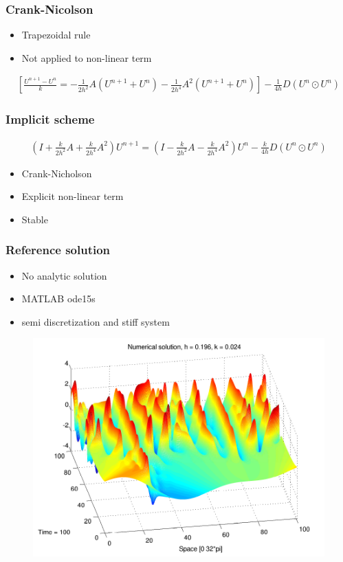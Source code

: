 \documentclass[screen]{beamer}
\begin{document}
\begin{frame}
\frametitle{Crank-Nicolson}
\begin{itemize}
\normalsize
\item Trapezoidal rule
\item Not applied to non-linear term
\end{itemize}
\small
\begin{align*}
 \left[\frac{U^{n+1} - U^n}{k} =
- \frac{1}{2h^2}A(U^{n+1}+U^n) - \frac{1}{2h^4}A^2(U^{n+1}+U^n) \right] - \frac{1}{4h}D(U^{n}\odot U^n)
\end{align*}

\end{frame}


\begin{frame}
\frametitle{Implicit scheme}
\begin{align*}
(I + \frac{k}{2h^2}A + \frac{k}{2h^4}A^2)U^{n+1}
= (I - \frac{k}{2h^2}A - \frac{k}{2h^4}A^2)U^n - \frac{k}{4h}D(U^{n}\odot U^n)
\end{align*}

\begin{itemize}
\item Crank-Nicholson
\item Explicit non-linear term
\item Stable
\end{itemize}

\end{frame}


\begin{frame}
\frametitle{Reference solution}
\begin{itemize}
\item No analytic solution
\item MATLAB ode15s
\item semi discretization and stiff system
\end{itemize}
\end{frame}


\begin{frame}

\begin{figure}[htb]
\includegraphics[width=1\textwidth]{KS_plot_surface.pdf}
\end{figure}

\end{frame}
\end{document}
